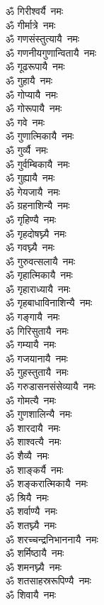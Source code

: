 \begin{flushleft}
\begin{multicols}{2}
ॐ गिरीश्वर्यै~नमः\\
ॐ गीर्मात्रे~नमः\\
ॐ गणसंस्तुत्यायै~नमः\\
ॐ गणनीयगुणान्वितायै~नमः\\
ॐ गूढरूपायै~नमः\\
ॐ गुहायै~नमः\\
ॐ गोप्यायै~नमः\\
ॐ गोरूपायै~नमः\hfill{}\\
ॐ गवे~नमः\\
ॐ गुणात्मिकायै~नमः\\
ॐ गुर्व्यै~नमः\\
ॐ गुर्वम्बिकायै~नमः\\
ॐ गुह्यायै~नमः\\
ॐ गेयजायै~नमः\\
ॐ ग्रहनाशिन्यै~नमः\\
ॐ गृहिण्यै~नमः\\
ॐ गृहदोषघ्न्यै~नमः\\
ॐ गवघ्न्यै~नमः\hfill{}\\
ॐ गुरुवत्सलायै~नमः\\
ॐ गृहात्मिकायै~नमः\\
ॐ गृहाराध्यायै~नमः\\
ॐ गृहबाधाविनाशिन्यै~नमः\\
ॐ गङ्गायै~नमः\\
ॐ गिरिसुतायै~नमः\\
ॐ गम्यायै~नमः\\
ॐ गजयानायै~नमः\\
ॐ गुहस्तुतायै~नमः\\
ॐ गरुडासनसंसेव्यायै~नमः\hfill{}\\
ॐ गोमत्यै~नमः\\
ॐ गुणशालिन्यै~नमः\\
ॐ शारदायै~नमः\\
ॐ शाश्वत्यै~नमः\\
ॐ शैव्यै~नमः\\
ॐ शाङ्कर्यै~नमः\\
ॐ शङ्करात्मिकायै~नमः\\
ॐ श्रियै~नमः\\
ॐ शर्वाण्यै~नमः\\
ॐ शतघ्न्यै~नमः\hfill{}\\
ॐ शरच्चन्द्रनिभाननायै~नमः\\
ॐ शर्मिष्ठायै~नमः\\
ॐ शमनघ्न्यै~नमः\\
ॐ शतसाहस्ररूपिण्यै~नमः\\
ॐ शिवायै~नमः\\

\end{multicols}
\end{flushleft}
